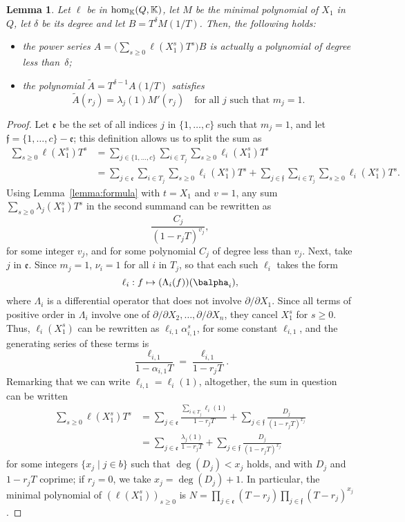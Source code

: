 \documentclass[12pt]{article}
\newtheorem{Lemma}{Lemma}
\def\K {\ensuremath{\mathbb{K}}}
\def\K{\mathbb{K}}
\begin{document}
\begin{Lemma}\label{lemma:valuelambda}
	Let $\ell$ be in ${\rm hom}_\K(Q,\K)$, let $M$ be the minimal
	polynomial of $X_1$ in $Q$, let $\delta$ be its degree and 
	let $B=T^{\delta}M(1/T)$. Then, the following holds:
	\begin{itemize}
		\item the power series $A = \Big(\sum_{s \ge 0}
		\ell(X_1^s)T^s\Big)B$ is actually a polynomial of degree less than~$\delta$;
		\item the polynomial $\tilde A = T^{\delta-1} A(1/T)$ satisfies
		$$\tilde A(r_j) = \lambda_j(1) M'(r_j) \quad \text{for all $j$ such that $m_j=1$.}$$
	\end{itemize}
\end{Lemma}
\begin{proof}
	Let $\mathfrak{e}$ be the set of all indices $j$ in $\{1,\dots,c\}$
	such that $m_j=1$, and let $\mathfrak{f}=\{1,\dots,c\}-\mathfrak{e}$;
	this definition allows us to split the sum as
	\begin{align*}
	\sum_{s \ge 0} \ell(X_1^s) T^s  
	&= \sum_{j \in \{1,\dots,c\}}\sum_{i\in T_j} 
	\sum_{s \ge 0}\ell_i(X_1^s)T^s  \\
	&=\sum_{j \in \mathfrak{e}}\sum_{i\in T_j}\sum_{s \ge 0}  \ell_i(X_1^s)T^s +
	\sum_{j \in \mathfrak{f}}\sum_{i\in T_j}\sum_{s \ge 0}  \ell_i(X_1^s)T^s.
	\end{align*}
	Using Lemma~\ref{lemma:formula} with $t=X_1$ and $v=1$, any sum $\sum_{s \ge 0} \lambda_j(X_1^s)T^s$ 
	in the second summand
	can be rewritten as 
	$$\frac{C_j}{(1-r_j T)^{v_j}},$$
	for some integer $v_j$, and for some polynomial $C_j$ of degree less than
	$v_j$. Next, take $j$ in $\mathfrak{e}$. Since $m_j=1$, $\nu_i=1$ for all $i$ in $T_j$,
	so that
	each such $\ell_i$ takes the form 
	$$\ell_i: f \mapsto (\Lambda_{i}(f))(\balpha_i),$$ where $\Lambda_{i}$
	is a differential operator that does not involve $\partial/\partial
	X_1$. Since all terms of positive order in $\Lambda_i$ involve one of
	$\partial/\partial X_2,\dots,\partial/\partial X_n$, they cancel
	$X_1^s$ for $s\ge 0$. Thus, $\ell_i(X_1^s)$ can be rewritten 
	as $\ell_{i,1} \alpha_{i,1}^s$, for some constant $\ell_{i,1}$,
	and the generating series of these terms is 
	$$\frac {\ell_{i,1}}{1-\alpha_{i,1}T}=\frac {\ell_{i,1}}{1-r_j T}.$$
	Remarking  that we can write $\ell_{i,1}=\ell_i(1)$,
	altogether, the sum in question can be written
	\begin{align*}
	\sum_{s \ge 0} \ell(X_1^s) T^s  
	&=\sum_{j \in \mathfrak{e}} 
	\frac{ \sum_{i\in T_j}  \ell_{i}(1) }{1-r_j T}
	+ \sum_{j \in \mathfrak{f}} \frac{D_j}{(1-r_j T)^{x_j}}\\
	&= \sum_{j \in \mathfrak{e}} 
	\frac{ \lambda_j(1) }{1-r_j T}
	+ \sum_{j \in \mathfrak{f}} \frac{D_j}{(1-r_j T)^{x_j}}
	\end{align*}
	for some integers $\{x_j \mid j \in b\}$ such that $\deg(D_j) < x_j$
	holds, and with $D_j$ and $1-r_j T$ coprime; if $r_j=0$, we take
	$x_j=\deg(D_j)+1$. In particular, the minimal polynomial of
	$(\ell(X_1^s))_{s\ge 0}$ is $N=\prod_{j\in \mathfrak{e}}(T-r_j)
	\prod_{j \in \mathfrak{f}}(T-r_j)^{x_j}$.
	

\end{proof}
\end{document}
